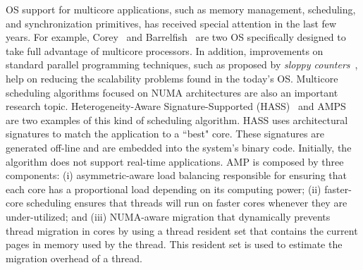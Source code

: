 \documentclass[conference]{IEEEtran}
\begin{document}
OS support for multicore applications, such as memory management, scheduling, and synchronization primitives, has received special attention in the last few years. For example, Corey~\cite{corey} and Barrelfish~\cite{Barrelfish} are two OS specifically designed to take full advantage of multicore processors. In addition, improvements on standard parallel programming techniques, such as proposed by \emph{sloppy counters}~\cite{BoydWickizer:10}, help on reducing the scalability problems found in the today's OS. Multicore scheduling algorithms focused on NUMA architectures are also an important research topic. Heterogeneity-Aware Signature-Supported (HASS)~\cite{Shelepov2009} and AMPS~\cite{Li2007} are two examples of this kind of scheduling algorithm. HASS uses architectural signatures to match the application to a ``best" core. These signatures are generated off-line and are embedded into the system's binary code. Initially, the algorithm does not support real-time applications. AMP is composed by three components: (i) asymmetric-aware load balancing responsible for ensuring that each core has a proportional load depending on its computing power; (ii) faster-core scheduling ensures that threads will run on faster cores whenever they are under-utilized; and (iii) NUMA-aware migration that dynamically prevents thread migration in cores by using a thread resident set that contains the current pages in memory used by the thread. This resident set is used to estimate the migration overhead of a thread.

\end{document}
